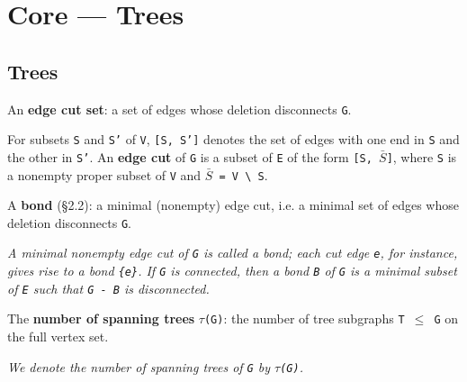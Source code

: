 \section{Core --- Trees}
\subsection{Trees}


\begin{definition}
\label{SimpleGraph.IsEdgeCutSet}
\leanok
An \textbf{edge cut set}: a set of edges whose deletion disconnects \texttt{G}.

For subsets \texttt{S} and \texttt{S'} of \texttt{V}, \texttt{[S, S']} denotes the set
of edges with one end in \texttt{S} and the other in \texttt{S'}. An \textbf{edge cut}
of \texttt{G} is a subset of \texttt{E} of the form \texttt{[S, $\bar{S}$]}, where
\texttt{S} is a nonempty proper subset of \texttt{V} and \texttt{$\bar{S}$ = V
\textbackslash{} S}.
\end{definition}

\begin{definition}
\label{SimpleGraph.IsBond}
\leanok
{}
A \textbf{bond} (\S{}2.2): a minimal (nonempty) edge cut, i.e. a minimal set of edges
whose
deletion disconnects \texttt{G}.

\emph{A minimal nonempty edge cut of \texttt{G} is called a
bond; each cut edge \texttt{e}, for instance, gives rise to a bond \texttt{\{e\}}. If
\texttt{G} is
connected, then a bond \texttt{B} of \texttt{G} is a minimal subset of \texttt{E} such
that \texttt{G - B} is
disconnected.}
\end{definition}

\begin{definition}
\label{SimpleGraph.numSpanningTrees}
\leanok
The \textbf{number of spanning trees} \texttt{$\tau$(G)}: the number of tree subgraphs
\texttt{T $\le$ G} on the
full vertex set.

\emph{We denote the number of spanning trees of \texttt{G} by
\texttt{$\tau$(G)}.}
\end{definition}

